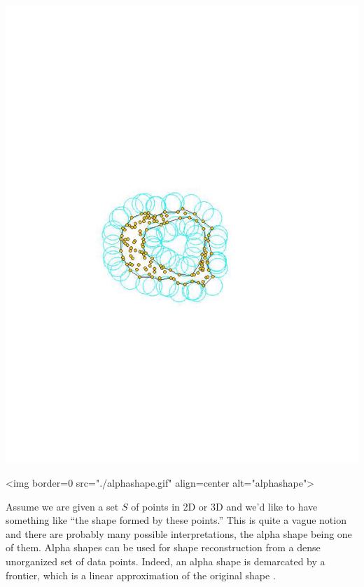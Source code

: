 
\begin{ccTexOnly}
\begin{center}
\includegraphics{Alpha_shapes_3/alphashape} 
\end{center}
\end{ccTexOnly}
\begin{ccHtmlOnly}
<img border=0 src="./alphashape.gif"  align=center  alt="alphashape">
\end{ccHtmlOnly}

Assume we are given a set $S$ of points in 2D or 3D and we'd like to
have something like ``the shape formed by these points.'' This is
quite a vague notion and there are probably many possible
interpretations, the alpha shape  being one of them. Alpha shapes
can be used for shape reconstruction from a dense unorganized set of
data points. Indeed, an alpha shape  is demarcated by a frontier,
which is a linear approximation of the original shape \cite{bb-srmua-97t}.

